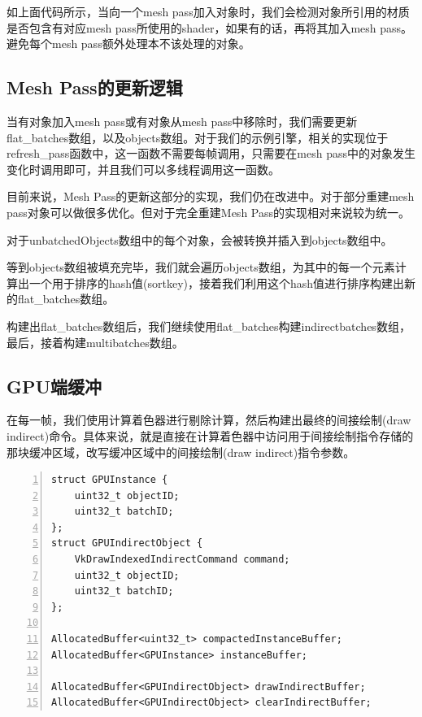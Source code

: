 \documentclass{ctexart}
\begin{document}
如上面代码所示，当向一个mesh pass加入对象时，我们会检测对象所引用的材质是否包含有对应mesh pass所使用的shader，如果有的话，再将其加入mesh pass。避免每个mesh pass额外处理本不该处理的对象。

\subsection{Mesh Pass的更新逻辑}

当有对象加入mesh pass或有对象从mesh pass中移除时，我们需要更新flat\_batches数组，以及objects数组。对于我们的示例引擎，相关的实现位于refresh\_pass函数中，这一函数不需要每帧调用，只需要在mesh pass中的对象发生变化时调用即可，并且我们可以多线程调用这一函数。

目前来说，Mesh Pass的更新这部分的实现，我们仍在改进中。对于部分重建mesh pass对象可以做很多优化。但对于完全重建Mesh Pass的实现相对来说较为统一。

对于unbatchedObjects数组中的每个对象，会被转换并插入到objects数组中。

等到objects数组被填充完毕，我们就会遍历objects数组，为其中的每一个元素计算出一个用于排序的hash值(sortkey)，接着我们利用这个hash值进行排序构建出新的flat\_batches数组。

构建出flat\_batches数组后，我们继续使用flat\_batches构建indirectbatches数组，最后，接着构建multibatches数组。

\subsection{GPU端缓冲}

在每一帧，我们使用计算着色器进行剔除计算，然后构建出最终的间接绘制(draw indirect)命令。具体来说，就是直接在计算着色器中访问用于间接绘制指令存储的那块缓冲区域，改写缓冲区域中的间接绘制(draw indirect)指令参数。

\begin{lstlisting}[language={[ANSI]C},keywordstyle=\color{blue!70},commentstyle=\color{red!50!green!50!blue!50},frame=shadowbox, rulesepcolor=\color{red!20!green!20!blue!20},basicstyle=\small,numbers=left, numberstyle=\tiny,breaklines=true]
struct GPUInstance {
	uint32_t objectID;
	uint32_t batchID;
};
struct GPUIndirectObject {
	VkDrawIndexedIndirectCommand command;
	uint32_t objectID;
	uint32_t batchID;
};

AllocatedBuffer<uint32_t> compactedInstanceBuffer;
AllocatedBuffer<GPUInstance> instanceBuffer;

AllocatedBuffer<GPUIndirectObject> drawIndirectBuffer;
AllocatedBuffer<GPUIndirectObject> clearIndirectBuffer;
\end{lstlisting}
\end{document}
